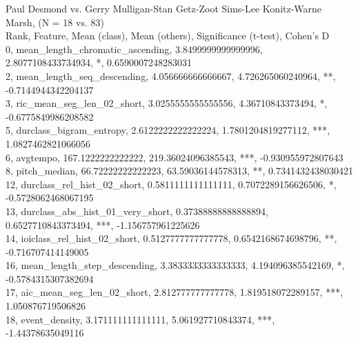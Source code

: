Paul Desmond vs. Gerry Mulligan-Stan Getz-Zoot Sims-Lee Konitz-Warne Marsh, (N = 18 vs. 83)\\
Rank, Feature, Mean (class), Mean (others), Significance (t-test), Cohen's D\\
0, mean_length_chromatic_ascending, 3.8499999999999996, 2.8077108433734934, *, 0.6590007248283031\\
2, mean_length_seq_descending, 4.056666666666667, 4.726265060240964, **, -0.7144944342204137\\
3, ric_mean_seg_len_02_short, 3.0255555555555556, 4.36710843373494, *, -0.6775849986208582\\
5, durclass_bigram_entropy, 2.6122222222222224, 1.7801204819277112, ***, 1.0827462821066056\\
6, avgtempo, 167.1222222222222, 219.36024096385543, ***, -0.930955972807643\\
8, pitch_median, 66.72222222222223, 63.59036144578313, **, 0.7341432438030421\\
12, durclass_rel_hist_02_short, 0.5811111111111111, 0.7072289156626506, *, -0.5728062468067195\\
13, durclass_abs_hist_01_very_short, 0.37388888888888894, 0.6527710843373494, ***, -1.156757961225626\\
14, ioiclass_rel_hist_02_short, 0.5127777777777778, 0.6542168674698796, **, -0.716707414149005\\
16, mean_length_step_descending, 3.3833333333333333, 4.194096385542169, *, -0.5784315307382694\\
17, aic_mean_seg_len_02_short, 2.812777777777778, 1.819518072289157, ***, 1.050876719506826\\
18, event_density, 3.171111111111111, 5.061927710843374, ***, -1.44378635049116\\
